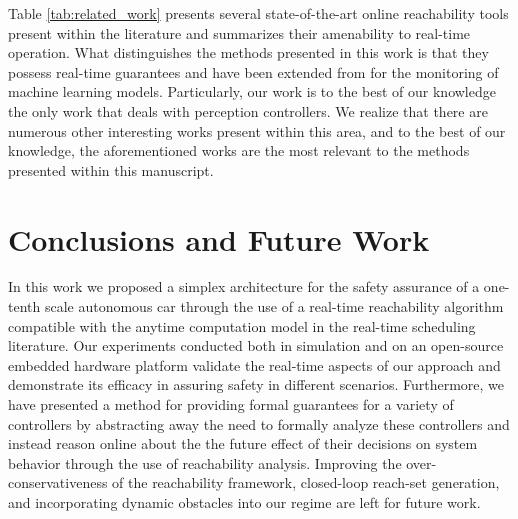 \documentclass[manuscript,screen,review]{acmart}
\newcommand{\diego}[1]{\textcolor{purple}{\textbf{\underline{DM:}} #1}}
\begin{document}


Table \ref{tab:related_work} presents several state-of-the-art online reachability tools present within the literature and summarizes their amenability to real-time operation. What distinguishes the methods presented in this work is that they possess real-time guarantees and have been extended from \cite{Johnson2016} for the monitoring of machine learning models. Particularly, our work is to the best of our knowledge the only work that deals with perception controllers. We realize that there are numerous other interesting works present within this area, and to the best of our knowledge, the aforementioned works are the most relevant to the methods presented within this manuscript.   

\section{Conclusions and Future Work}

In this work we proposed a simplex architecture for the safety assurance of a one-tenth scale autonomous car through the use of a real-time reachability algorithm compatible with the anytime computation model in the real-time scheduling literature. Our experiments conducted both in simulation and on an open-source embedded hardware platform validate the real-time aspects of our approach and demonstrate its efficacy in assuring safety in different scenarios. Furthermore, we have presented a method for providing formal guarantees for a variety of controllers by abstracting away the need to formally analyze these controllers and instead reason online about the the future effect of their decisions on system behavior through the use of reachability analysis. Improving the over-conservativeness of the reachability framework,  closed-loop reach-set generation, and incorporating dynamic obstacles into our regime are left for future work.


\end{document}
